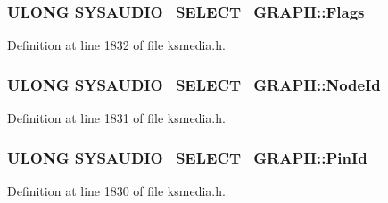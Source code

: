 \subsubsection[{\texorpdfstring{Flags}{Flags}}]{\setlength{\rightskip}{0pt plus 5cm}U\+L\+O\+NG S\+Y\+S\+A\+U\+D\+I\+O\+\_\+\+S\+E\+L\+E\+C\+T\+\_\+\+G\+R\+A\+P\+H\+::\+Flags}\hypertarget{struct_s_y_s_a_u_d_i_o___s_e_l_e_c_t___g_r_a_p_h_a6f6e20aa9cb3f6e463407bc70e4a0921}{}\label{struct_s_y_s_a_u_d_i_o___s_e_l_e_c_t___g_r_a_p_h_a6f6e20aa9cb3f6e463407bc70e4a0921}


Definition at line 1832 of file ksmedia.\+h.

\subsubsection[{\texorpdfstring{Node\+Id}{NodeId}}]{\setlength{\rightskip}{0pt plus 5cm}U\+L\+O\+NG S\+Y\+S\+A\+U\+D\+I\+O\+\_\+\+S\+E\+L\+E\+C\+T\+\_\+\+G\+R\+A\+P\+H\+::\+Node\+Id}\hypertarget{struct_s_y_s_a_u_d_i_o___s_e_l_e_c_t___g_r_a_p_h_a7b44821d351bc79d90925ed91682bf37}{}\label{struct_s_y_s_a_u_d_i_o___s_e_l_e_c_t___g_r_a_p_h_a7b44821d351bc79d90925ed91682bf37}


Definition at line 1831 of file ksmedia.\+h.

\subsubsection[{\texorpdfstring{Pin\+Id}{PinId}}]{\setlength{\rightskip}{0pt plus 5cm}U\+L\+O\+NG S\+Y\+S\+A\+U\+D\+I\+O\+\_\+\+S\+E\+L\+E\+C\+T\+\_\+\+G\+R\+A\+P\+H\+::\+Pin\+Id}\hypertarget{struct_s_y_s_a_u_d_i_o___s_e_l_e_c_t___g_r_a_p_h_a01e0e455558651e05ea85021b4686120}{}\label{struct_s_y_s_a_u_d_i_o___s_e_l_e_c_t___g_r_a_p_h_a01e0e455558651e05ea85021b4686120}


Definition at line 1830 of file ksmedia.\+h.

